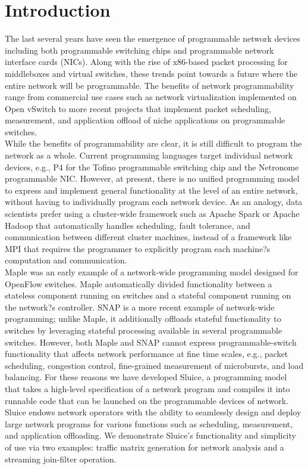 \section{Introduction}
The last several years have seen the emergence of programmable network devices including both programmable switching chips and programmable network interface cards (NICs). Along with the rise of x86-based packet processing for middleboxes and virtual switches, these trends point towards a future where the entire network will be programmable. The benefits of network programmability range from commercial use cases such as network virtualization implemented on Open vSwitch to more recent projects that implement packet scheduling, measurement, and application offload of niche applications on programmable switches. \\
\indent While the benefits of programmability are clear, it is still difficult to program the network as a whole. Current programming languages target individual network devices, e.g., P4 for the Tofino programmable switching chip and the Netronome programmable NIC. However, at present, there is no unified programming model to express and implement general functionality at the level of an entire network, without having to individually program each network device. As an analogy, data scientists prefer using a cluster-wide framework such as Apache Spark or Apache Hadoop that automatically handles scheduling, fault tolerance, and communication between different cluster machines, instead of a framework like MPI that requires the programmer to explicitly program each machine?s computation and communication.\\
\indent Maple was an early example of a network-wide programming model designed for OpenFlow switches. Maple automatically divided functionality between a stateless component running on switches and a stateful component running on the network?s controller. SNAP is a more recent example of network-wide programming; unlike Maple, it additionally offloads stateful functionality to switches by leveraging stateful processing available in several programmable switches. However, both Maple and SNAP cannot express programmable-switch functionality that affects network performance at fine time scales, e.g., packet scheduling, congestion control, fine-grained measurement of microbursts, and load balancing. For these reasons we have developed Sluice, a programming model that takes a high-level specification of a network program and compiles it into runnable code that can be launched on the programmable devices of network. Sluice endows network operators with the ability to seamlessly design and deploy large network programs for various functions such as scheduling, measurement, and application offloading. We demonstrate Sluice's functionality and simplicity of use via two examples: traffic matrix generation for network analysis and a streaming join-filter operation.


